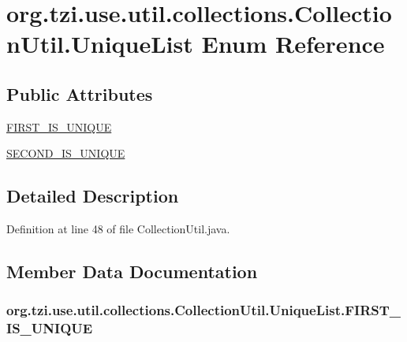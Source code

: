\hypertarget{enumorg_1_1tzi_1_1use_1_1util_1_1collections_1_1_collection_util_1_1_unique_list}{\section{org.\-tzi.\-use.\-util.\-collections.\-Collection\-Util.\-Unique\-List Enum Reference}
\label{enumorg_1_1tzi_1_1use_1_1util_1_1collections_1_1_collection_util_1_1_unique_list}
}
\subsection*{Public Attributes}
\begin{DoxyCompactItemize}
\item 
\hyperlink{enumorg_1_1tzi_1_1use_1_1util_1_1collections_1_1_collection_util_1_1_unique_list_a9f0e2aa6cb71e174156dcb0d8c5acd92}{F\-I\-R\-S\-T\-\_\-\-I\-S\-\_\-\-U\-N\-I\-Q\-U\-E}
\item 
\hyperlink{enumorg_1_1tzi_1_1use_1_1util_1_1collections_1_1_collection_util_1_1_unique_list_a305934989dfd6d0313543b74a538db67}{S\-E\-C\-O\-N\-D\-\_\-\-I\-S\-\_\-\-U\-N\-I\-Q\-U\-E}
\end{DoxyCompactItemize}


\subsection{Detailed Description}


Definition at line 48 of file Collection\-Util.\-java.



\subsection{Member Data Documentation}
\hypertarget{enumorg_1_1tzi_1_1use_1_1util_1_1collections_1_1_collection_util_1_1_unique_list_a9f0e2aa6cb71e174156dcb0d8c5acd92}{
\subsubsection[{F\-I\-R\-S\-T\-\_\-\-I\-S\-\_\-\-U\-N\-I\-Q\-U\-E}]{\setlength{\rightskip}{0pt plus 5cm}org.\-tzi.\-use.\-util.\-collections.\-Collection\-Util.\-Unique\-List.\-F\-I\-R\-S\-T\-\_\-\-I\-S\-\_\-\-U\-N\-I\-Q\-U\-E}}\label{enumorg_1_1tzi_1_1use_1_1util_1_1collections_1_1_collection_util_1_1_unique_list_a9f0e2aa6cb71e174156dcb0d8c5acd92}


